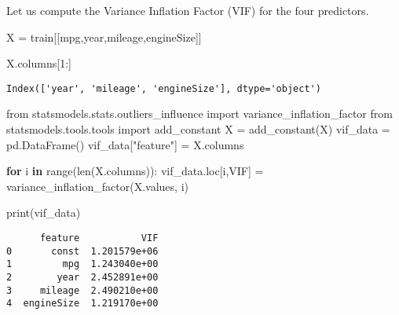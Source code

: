 \documentclass[
  letterpaper,
  DIV=11,
  numbers=noendperiod]{scrreprt}
\newenvironment{Shaded}{\begin{snugshade}}{\end{snugshade}}
\newcommand{\BuiltInTok}[1]{\textcolor[rgb]{0.00,0.23,0.31}{#1}}
\newcommand{\ControlFlowTok}[1]{\textcolor[rgb]{0.00,0.23,0.31}{\textbf{#1}}}
\newcommand{\DecValTok}[1]{\textcolor[rgb]{0.68,0.00,0.00}{#1}}
\newcommand{\ImportTok}[1]{\textcolor[rgb]{0.00,0.46,0.62}{#1}}
\newcommand{\KeywordTok}[1]{\textcolor[rgb]{0.00,0.23,0.31}{\textbf{#1}}}
\newcommand{\NormalTok}[1]{\textcolor[rgb]{0.00,0.23,0.31}{#1}}
\newcommand{\OperatorTok}[1]{\textcolor[rgb]{0.37,0.37,0.37}{#1}}
\newcommand{\StringTok}[1]{\textcolor[rgb]{0.13,0.47,0.30}{#1}}
\begin{document}
Let us compute the Variance Inflation Factor (VIF) for the four
predictors.

\begin{Shaded}
\begin{Highlighting}[]
\NormalTok{X }\OperatorTok{=}\NormalTok{ train[[}\StringTok{\textquotesingle{}mpg\textquotesingle{}}\NormalTok{,}\StringTok{\textquotesingle{}year\textquotesingle{}}\NormalTok{,}\StringTok{\textquotesingle{}mileage\textquotesingle{}}\NormalTok{,}\StringTok{\textquotesingle{}engineSize\textquotesingle{}}\NormalTok{]]}
\end{Highlighting}
\end{Shaded}

\begin{Shaded}
\begin{Highlighting}[]
\NormalTok{X.columns[}\DecValTok{1}\NormalTok{:]}
\end{Highlighting}
\end{Shaded}

\begin{verbatim}
Index(['year', 'mileage', 'engineSize'], dtype='object')
\end{verbatim}

\begin{Shaded}
\begin{Highlighting}[]
\ImportTok{from}\NormalTok{ statsmodels.stats.outliers\_influence }\ImportTok{import}\NormalTok{ variance\_inflation\_factor}
\ImportTok{from}\NormalTok{ statsmodels.tools.tools }\ImportTok{import}\NormalTok{ add\_constant}
\NormalTok{X }\OperatorTok{=}\NormalTok{ add\_constant(X)}
\NormalTok{vif\_data }\OperatorTok{=}\NormalTok{ pd.DataFrame()}
\NormalTok{vif\_data[}\StringTok{"feature"}\NormalTok{] }\OperatorTok{=}\NormalTok{ X.columns}

\ControlFlowTok{for}\NormalTok{ i }\KeywordTok{in} \BuiltInTok{range}\NormalTok{(}\BuiltInTok{len}\NormalTok{(X.columns)):}
\NormalTok{    vif\_data.loc[i,}\StringTok{\textquotesingle{}VIF\textquotesingle{}}\NormalTok{] }\OperatorTok{=}\NormalTok{ variance\_inflation\_factor(X.values, i)}

\BuiltInTok{print}\NormalTok{(vif\_data)}
\end{Highlighting}
\end{Shaded}

\begin{verbatim}
      feature           VIF
0       const  1.201579e+06
1         mpg  1.243040e+00
2        year  2.452891e+00
3     mileage  2.490210e+00
4  engineSize  1.219170e+00
\end{verbatim}
\end{document}
